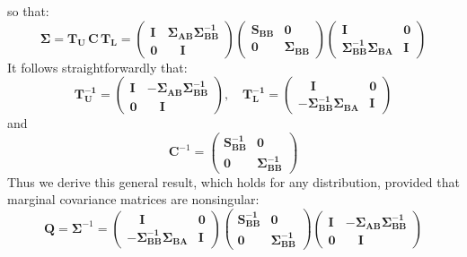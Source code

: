 \documentclass{book}
\begin{document}
 so that:
$$
\mathbf{\Sigma} = \mathbf{T_U} \, \mathbf{C} \, \mathbf{T_L} =
 \left( \begin{array}{ll} 
	\mathbf{I} &  \mathbf{\Sigma_{AB}} \mathbf{\Sigma_{BB}^{-1}}
	\\ \mathbf{0} & \quad \mathbf{I} \quad
\end{array}
\right)
\left( \begin{array}{ll} 
	\mathbf{S_{BB}}   & \mathbf{0}\\ 
	\mathbf{0}  & \mathbf{\Sigma_{BB}}
\end{array} \right)
\left( \begin{array}{ll} 
	\mathbf{I} & \mathbf{0}\\ 
	\mathbf{\Sigma_{BB}^{-1}} \mathbf{\Sigma_{BA}} & \mathbf{I}
\end{array}
\right)
$$
It follows straightforwardly that:
$$
\mathbf{T_U^{-1}} =  
\left( \begin{array}{ll} 
	\mathbf{I} & - \mathbf{\Sigma_{AB}} \mathbf{\Sigma_{BB}^{-1}}
	\\ \mathbf{0} & \quad \mathbf{I} \quad
\end{array}
\right), \quad
\mathbf{T_L^{-1}} = 
\left( \begin{array}{ll} 
	\quad \mathbf{I} & \mathbf{0}\\ 
	- \mathbf{\Sigma_{BB}^{-1}} \mathbf{\Sigma_{BA}} & \mathbf{I}
\end{array}
\right)
$$ and $$
\mathbf{C}^{-1} = 
\left( \begin{array}{ll} 
	\mathbf{S_{BB}^{-1}}   & \mathbf{0}\\ 
	\mathbf{0}  & \mathbf{\Sigma_{BB}^{-1}}
\end{array} \right)
$$
Thus we derive this general result, which holds for any distribution, provided that marginal covariance matrices are nonsingular:
\begin{equation}
	\mathbf{Q} = \mathbf{\Sigma}^{-1} = 
	\left( \begin{array}{ll} 
		\quad \mathbf{I} & \mathbf{0}\\ 
		- \mathbf{\Sigma_{BB}^{-1}} \mathbf{\Sigma_{BA}} & \mathbf{I}
	\end{array}
	\right)
	\left( \begin{array}{ll} 
		\mathbf{S_{BB}^{-1}}   & \mathbf{0}\\ 
		\mathbf{0}  & \mathbf{\Sigma_{BB}^{-1}}
	\end{array} \right)
    \left( \begin{array}{ll} 
    	\mathbf{I} & - \mathbf{\Sigma_{AB}} \mathbf{\Sigma_{BB}^{-1}}\\ 
    	\mathbf{0} & \quad \mathbf{I} \quad
    \end{array} \right)
\label{eq:precision1}
\end{equation}
\end{document}
